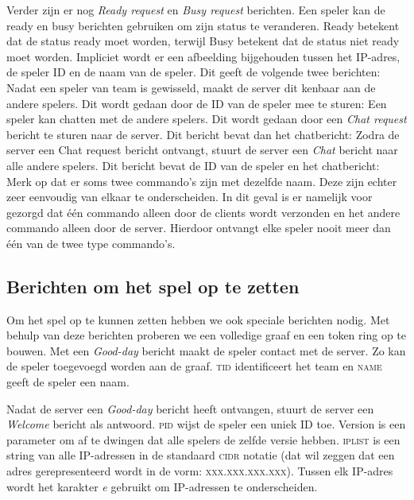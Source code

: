     Verder zijn er nog \emph{Ready request} en \emph{Busy request} berichten. Een speler kan de ready en busy berichten gebruiken om zijn status te veranderen. Ready betekent dat de status ready moet worden, terwijl Busy betekent dat de status niet ready moet worden. Impliciet wordt er een afbeelding bijgehouden tussen het IP-adres, de speler ID en de naam van de speler. Dit geeft de volgende twee berichten:
    Nadat een speler van team is gewisseld, maakt de server dit kenbaar aan de andere spelers. Dit wordt gedaan door de ID van de speler mee te sturen:
    Een speler kan chatten met de andere spelers. Dit wordt gedaan door een \emph{Chat request} bericht te sturen naar de server. Dit bericht bevat dan het chatbericht:
    Zodra de server een Chat request bericht ontvangt, stuurt de server een \emph{Chat} bericht naar alle andere spelers. Dit bericht bevat de ID van de speler en het chatbericht:
    Merk op dat er soms twee commando's zijn met dezelfde naam. Deze zijn echter zeer eenvoudig van elkaar te onderscheiden. In dit geval is er namelijk voor gezorgd dat \'e\'en commando alleen door de clients wordt verzonden en het andere commando alleen door de server. Hierdoor ontvangt elke speler nooit meer dan \'e\'en van de twee type commando's.

\subsection{Berichten om het spel op te zetten}
Om het spel op te kunnen zetten hebben we ook speciale berichten nodig. Met behulp van deze berichten proberen we een volledige graaf en een token ring op te bouwen. Met een \emph{Good-day} bericht maakt de speler contact met de server. Zo kan de speler toegevoegd worden aan de graaf. \textsc{tid} identificeert het team en \textsc{name} geeft de speler een naam.

Nadat de server een \emph{Good-day} bericht heeft ontvangen, stuurt de server een \emph{Welcome} bericht als antwoord. \textsc{pid} wijst de speler een uniek ID toe. Version is een parameter om af te dwingen dat alle spelers de zelfde versie hebben. \textsc{iplist} is een string van alle IP-adressen in de standaard \textsc{cidr} notatie (dat wil zeggen dat een adres gerepresenteerd wordt in de vorm: \textsc{xxx.xxx.xxx.xxx}). Tussen elk IP-adres wordt het karakter \emph{e} gebruikt om IP-adressen te onderscheiden.

